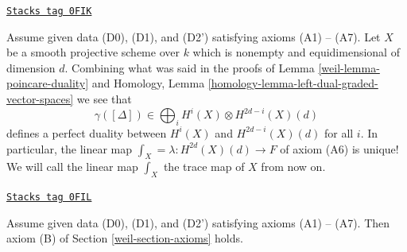 \begin{remark}

\label{weil-remark-trace}
\href{https://stacks.math.columbia.edu/tag/0FIK}{\texttt{Stacks tag 0FIK}}

Assume given data (D0), (D1), and (D2') satisfying axioms (A1) -- (A7).
Let $X$ be a smooth projective scheme over $k$ which is nonempty
and equidimensional of dimension $d$. Combining what was said in
the proofs of Lemma \ref{weil-lemma-poincare-duality} and
Homology, Lemma \ref{homology-lemma-left-dual-graded-vector-spaces}
we see that
$$
\gamma([\Delta]) \in \bigoplus\nolimits_i H^i(X) \otimes H^{2d - i}(X)(d)
$$
defines a perfect duality between $H^i(X)$ and $H^{2d - i}(X)(d)$
for all $i$.
In particular, the linear map $\int_X = \lambda : H^{2d}(X)(d) \to F$ of
axiom (A6) is unique! We will call the linear map $\int_X$ the trace map
of $X$ from now on.
\end{remark}

\begin{lemma}
\label{weil-lemma-trace-product}
\href{https://stacks.math.columbia.edu/tag/0FIL}{\texttt{Stacks tag 0FIL}}

Assume given data (D0), (D1), and (D2') satisfying axioms (A1) -- (A7).
Then axiom (B) of Section \ref{weil-section-axioms} holds.
\end{lemma}

